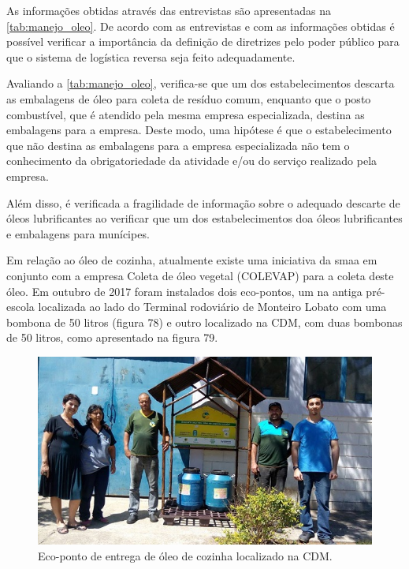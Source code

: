 \begin{description}
	
	As informações obtidas através das entrevistas são apresentadas na \autoref{tab:manejo_oleo}. De acordo com as entrevistas e com as informações obtidas é possível verificar a importância da definição de diretrizes pelo poder público para que o sistema de logística reversa seja feito adequadamente.

	Avaliando a \autoref{tab:manejo_oleo}, verifica-se que um dos estabelecimentos descarta as embalagens de óleo para coleta de resíduo comum, enquanto que o posto combustível, que é atendido pela mesma empresa especializada, destina as embalagens para a empresa. Deste modo, uma hipótese é que o estabelecimento que não destina as embalagens para a empresa especializada não tem o conhecimento da obrigatoriedade da atividade e/ou do serviço realizado pela empresa.
	
	Além disso, é verificada a fragilidade de informação sobre o adequado descarte de óleos lubrificantes ao verificar que um dos estabelecimentos doa óleos lubrificantes e embalagens para munícipes.
	
	
	
	Em relação ao óleo de cozinha, atualmente existe uma iniciativa da \gls{smaa} em conjunto com a empresa Coleta de óleo vegetal (COLEVAP) para a coleta deste óleo. Em outubro de 2017 foram instalados dois eco-pontos, um na antiga pré-escola localizada ao lado do Terminal rodoviário de Monteiro Lobato com uma bombona de 50 litros (figura 78) e outro localizado na CDM, com duas bombonas de 50 litros, como apresentado na figura 79.
	
	\begin{figure}
		\centering
		\includegraphics[width=0.75\linewidth]{produtos/prodtres/image094}
		\caption{Eco-ponto de entrega de óleo de cozinha localizado na CDM.}
		\label{fig:image094}
	\end{figure}
	

\end{description}
